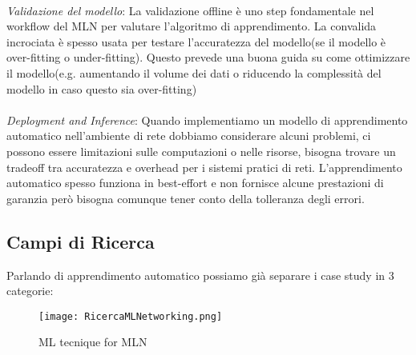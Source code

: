\documentclass[../tesi.tex]{subfiles}
\begin{document}
\\
\textit{Validazione del modello}: La validazione offline è uno step fondamentale nel workflow del MLN per valutare l’algoritmo di apprendimento. La convalida incrociata è spesso usata per testare l’accuratezza del modello(se il modello è \Gls{over-fitting} o \Gls{under-fitting}).
Questo prevede una buona guida su come ottimizzare il modello(e.g. aumentando il volume dei dati o riducendo la complessità del modello in caso questo sia \Gls{over-fitting})\\
\\
\textit{Deployment and Inference}: Quando implementiamo un modello di apprendimento automatico nell’ambiente di rete dobbiamo considerare alcuni problemi, ci possono essere limitazioni sulle computazioni o nelle risorse, bisogna trovare un tradeoff tra accuratezza e overhead per i sistemi pratici di reti. L’apprendimento automatico spesso funziona in best-effort e non fornisce alcune prestazioni di garanzia però bisogna comunque tener conto della tolleranza degli errori.
\subsection{Campi di Ricerca}
Parlando di apprendimento automatico possiamo già separare i case study in 3 categorie:
\begin{figure}[htbp]
\center
\texttt{[image: RicercaMLNetworking.png]}
\caption{ML tecnique for MLN} 
\end{figure}
\\
\end{document}
